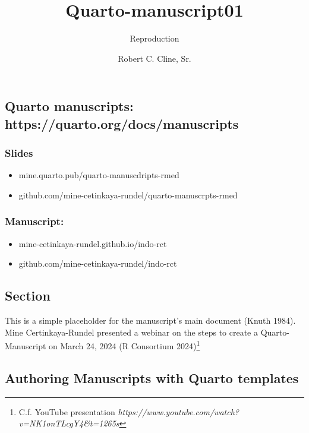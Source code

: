 \documentclass[
  letterpaper,
  DIV=11,
  numbers=noendperiod]{scrartcl}
\title{Quarto-manuscript01}
\subtitle{Reproduction}
\author{Robert C. Cline, Sr.}
\date{}
\providecommand{\tightlist}{%
  \setlength{\itemsep}{0pt}\setlength{\parskip}{0pt}}\usepackage{longtable,booktabs,array}
\begin{document}
\maketitle

\subsection{Quarto manuscripts:
https://quarto.org/docs/manuscripts}\label{quarto-manuscripts-httpsquarto.orgdocsmanuscripts}

\subsubsection{Slides}\label{slides}

\begin{itemize}
\tightlist
\item
  mine.quarto.pub/quarto-manuscdripts-rmed\\
\item
  github.com/mine-cetinkaya-rundel/quarto-manuscrpts-rmed
\end{itemize}

\subsubsection{Manuscript:}\label{manuscript}

\begin{itemize}
\tightlist
\item
  mine-cetinkaya-rundel.github.io/indo-rct\\
\item
  github.com/mine-cetinkaya-rundel/indo-rct
\end{itemize}

\subsection{Section}\label{section}

This is a simple placeholder for the manuscript's main document (Knuth
1984). Mine Certinkaya-Rundel presented a webinar on the steps to create
a Quarto-Manuscript on March 24, 2024 (R Consortium 2024)\footnote{C.f.
  YouTube presentation
  \emph{https://www.youtube.com/watch?v=NK1onTLcgY4\&t=1265s}}

\subsection{Authoring Manuscripts with Quarto
templates}\label{authoring-manuscripts-with-quarto-templates}
\end{document}
